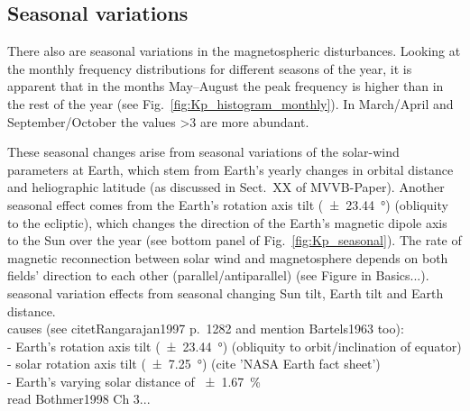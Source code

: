 \subsection{Seasonal \Kp{} variations}
There also are seasonal variations in the magnetospheric disturbances. Looking at the monthly \Kp{} frequency distributions for different seasons of the year, it is apparent that in the months May--August the \Kp{} peak frequency is higher than in the rest of the year (see Fig.~\ref{fig:Kp_histogram_monthly}). In March/April and September/October the \Kp{} values \num{>3} are more abundant.\\
\begin{figure}
\end{figure}
These seasonal \Kp{} changes arise from seasonal variations of the solar-wind parameters at Earth, which stem from Earth's yearly changes in orbital distance and heliographic latitude (as discussed in Sect.~XX of MVVB-Paper). Another seasonal effect comes from the Earth's rotation axis tilt (\SI{+-23.44}{\degree}) (obliquity to the ecliptic), which changes the direction of the Earth's magnetic dipole axis to the Sun over the year (see bottom panel of Fig.~\ref{fig:Kp_seasonal}). The rate of magnetic reconnection between solar wind and magnetosphere depends on both fields' direction to each other (parallel/antiparallel) (see Figure in Basics...).\\

\Kp{} seasonal variation effects from seasonal changing Sun tilt, Earth tilt and Earth distance.\\
causes (see citet{Rangarajan1997} p.~1282 and mention Bartels1963 too):\\
- Earth's rotation axis tilt (\SI{+-23.44}{\degree}) (obliquity to orbit/inclination of equator)\\
- solar rotation axis tilt (\SI{+-7.25}{\degree}) (cite 'NASA Earth fact sheet')\\
- Earth's varying solar distance of \SI{+-1.67}{\percent}\\
read Bothmer1998 Ch 3...\\


